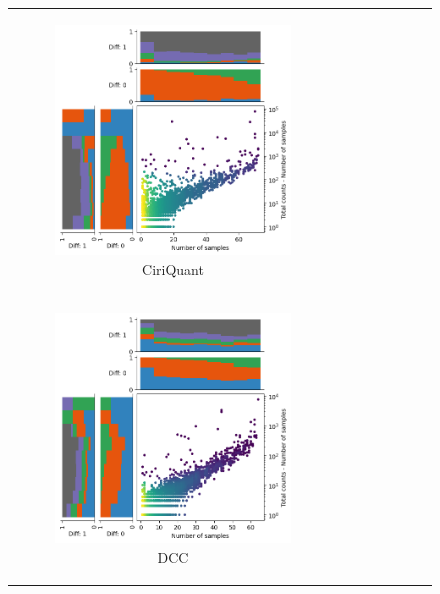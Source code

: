 \begin{figure}[ht]
\begin{tabular}{cc}
\begin{subfigure}{.5\textwidth}
            \includegraphics[width=\linewidth]{chapters/4_results_and_discussion/figures/detection/min_samples_0/density/ciriquant.png}
            \caption{CiriQuant}
            \label{fig:detection_density_ciriquant}
        \end{subfigure} \\
        \begin{subfigure}{.5\textwidth}
            \centering

            \includegraphics[width=\linewidth]{chapters/4_results_and_discussion/figures/detection/min_samples_0/density/dcc.png}
            \caption{DCC}
            \label{fig:detection_density_dcc}
        \end{subfigure}
         &
        \begin{subfigure}{.5\textwidth}
            \centering


\end{subfigure}
\end{tabular}
\end{figure}
